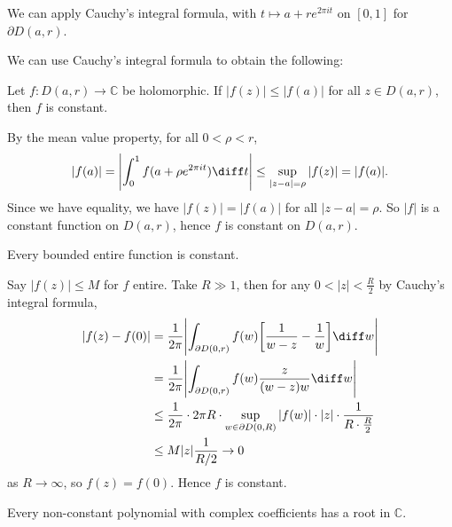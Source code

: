 \documentclass[12pt]{article}
\begin{document}
\begin{proofbox}
	We can apply Cauchy's integral formula, with $t \mapsto a + re^{2 \pi i t}$ on $[0, 1]$ for $\partial D(a, r)$.
\end{proofbox}

We can use Cauchy's integral formula to obtain the following:

\begin{corollary}
	Let $f : D(a, r) \to \mathbb{C}$ be holomorphic. If $|f(z)| \leq |f(a)|$ for all $z \in D(a, r)$, then $f$ is constant.
\end{corollary}

\begin{proofbox}
	By the mean value property, for all $0 < \rho < r$,
	\[
	|f(a)| = \Biggl| \int_{0}^{1} f(a + \rho e^{2 \pi i t})\diff t \Biggr| \leq \sup_{|z - a| = \rho}|f(z)| = |f(a)|
	.\]
	Since we have equality, we have $|f(z)| = |f(a)|$ for all $|z - a| = \rho$. So $|f|$ is a constant function on $D(a, r)$, hence $f$ is constant on $D(a, r)$.
\end{proofbox}

\begin{theorem}
	Every bounded entire function is constant.
\end{theorem}

\begin{proofbox}
	Say $|f(z)| \leq M$ for $f$ entire. Take $R \gg 1$, then for any $0 < |z| < \frac{R}{2}$ by Cauchy's integral formula,
	\begin{align*}
	|f(z) - f(0)| &= \frac{1}{2 \pi} \Biggl| \int_{\partial D(0, r)} f(w) \biggl[\frac{1}{w - z} - \frac{1}{w} \biggr] \diff w \Biggr| \\
		      &= \frac{1}{2 \pi} \Biggl| \int_{\partial D(0, r)} f(w) \frac{z}{(w - z)w} \diff w \Biggr| \\
		      &\leq \frac{1}{2 \pi} \cdot 2 \pi R \cdot \sup_{w \in \partial D(0, R)}|f(w)| \cdot |z| \cdot \frac{1}{R \cdot \frac{R}{2}} \\
		      & \leq M |z| \frac{1}{R/2} \to 0
	\end{align*}
	as $R \to \infty$, so $f(z) = f(0)$. Hence $f$ is constant.
\end{proofbox}

\begin{corollary}
	Every non-constant polynomial with complex coefficients has a root in $\mathbb{C}$.
\end{corollary}
\end{document}
